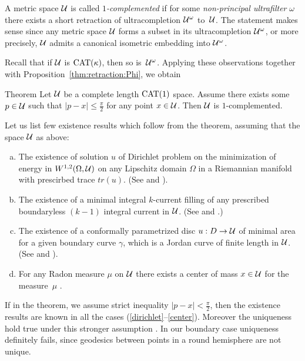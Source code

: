 \documentclass[oneside,a4paper, 12pt]{article}
\begin{document}
A metric space ${\mathcal{U}}$ is called \emph{$1$-complemented} if for some \emph{non-principal ultrafilter} $\omega$  there exists a short retraction of ultracompletion ${\mathcal{U}}^{\omega}$ to~${\mathcal{U}}$.
The statement makes sense since any metric space ${\mathcal{U}}$ forms a subset in its ultracompletion ${\mathcal{U}}^{\omega}$, or more precisely, ${\mathcal{U}}$ admits a canonical isometric embedding into ${\mathcal{U}}^{\omega}$. 

Recall that if ${\mathcal{U}}$ is $\mathrm{CAT}(\kappa)$, then so is~${\mathcal{U}}^\omega$. 
Applying these observations together with Proposition~\ref{thm:retraction:Phi}, we obtain

\begin{thm}{Theorem}\label{thm:complemented}
Let ${\mathcal{U}}$ be a complete length $\mathrm{CAT}(1)$ space.
Assume  there exists some $p\in {\mathcal{U}}$ such that $|p-x|\le \tfrac\pi2$ for any point $x\in {\mathcal{U}}$.
Then ${\mathcal{U}}$ is $1$-complemented.
\end{thm}

Let us list few existence results which follow from the theorem, assuming that the space ${\mathcal{U}}$ as above:
\begin{enumerate}[(a)]
\item\label{dirichlet}   The existence of solution $u$ of Dirichlet problem on the minimization of energy 
in $W^{1,2} (\Omega, {\mathcal{U}})$ on any Lipschitz domain $\Omega$ in a Riemannian manifold with prescirbed trace $tr(u)$.
(See \cite{KS} and \cite[Theorem 1.4]{guo-wenger}).
\item The existence of a minimal integral $k$-current filling of any prescribed boundaryless $(k-1)$ integral current in ${\mathcal{U}}$. 
(See \cite{Ambrosio} and \cite[Theorem 3.3]{Wenger-1comp}.)
\item   The existence of a conformally parametrized disc $u:D\to {\mathcal{U}}$ of minimal area for a given boundary curve $\gamma$, which is a Jordan curve of finite length in ${\mathcal{U}}$.
(See \cite{LWplateau} and \cite[Theorem 1.2]{guo-wenger}).
\item\label{center} For any Radon measure $\mu$ on ${\mathcal{U}}$ there exists a center of mass $x\in {\mathcal{U}}$ for the measure~$\mu$ \cite{Sturm, yokota}.
\end{enumerate}

If in the theorem, we assume strict inequality $|p-x|< \tfrac\pi2$, then the existence results are known  in all the cases (\ref{dirichlet}--\ref{center}).
Moreover the uniqueness hold true under this stronger assumption
\cite{yokota,serbinowski}.
In our boundary case uniqueness definitely fails, since geodesics between points in a round hemisphere are not unique.
\end{document}
